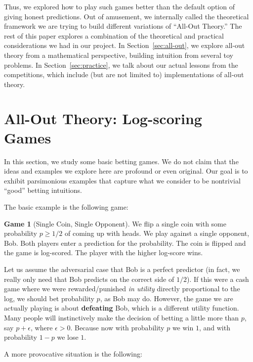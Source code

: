 \documentclass[12pt,twoside,singlespace]{article}
\numberwithin{equation}{section}
\theoremstyle{definition}
\newtheorem{game}{Game}
\begin{document}
Thus, we explored how to play such games better than the default option of giving honest predictions. Out of amusement, we internally called the theoretical framework we are trying to build different variations of ``All-Out Theory.'' The rest of this paper explores a combination of the theoretical and practical considerations we had in our project. In Section~\ref{sec:all-out}, we explore all-out theory from a mathematical perspective, building intuition from several toy problems. In Section~\ref{sec:practice}, we talk about our actual lessons from the competitions, which include (but are not limited to) implementations of all-out theory.

\section{All-Out Theory: Log-scoring Games}

In this section, we study some basic betting games. We do not claim that the ideas and examples we explore here are profound or even original. Our goal is to exhibit parsimonious examples that capture what we consider to be nontrivial ``good'' betting intuitions.

The basic example is the following game: 

\begin{game}[Single Coin, Single Opponent]
\label{game:bob}
We flip a single coin with some probability $p \geq 1/2$ of coming up with heads. We play against a single opponent, Bob. Both players enter a prediction for the probability. The coin is flipped and the game is log-scored. The player with the higher log-score wins.
\end{game}

Let us assume the adversarial case that Bob is a perfect predictor (in fact, we really only need that Bob predicts on the correct side of $1/2$). If this were a cash game where we were rewarded/punished \emph{in utility} directly proportional to the log, we should bet probability $p$, as Bob may do.  However, the game we are actually playing is about \textbf{defeating} Bob, which is a different utility function. Many people will instinctively make the decision of betting a little more than $p$, say $p + \epsilon$, where $\epsilon > 0$. Because now with probability $p$ we win $1$, and with probability $1-p$ we lose $1$. 

A more provocative situation is the following: 
\end{document}
